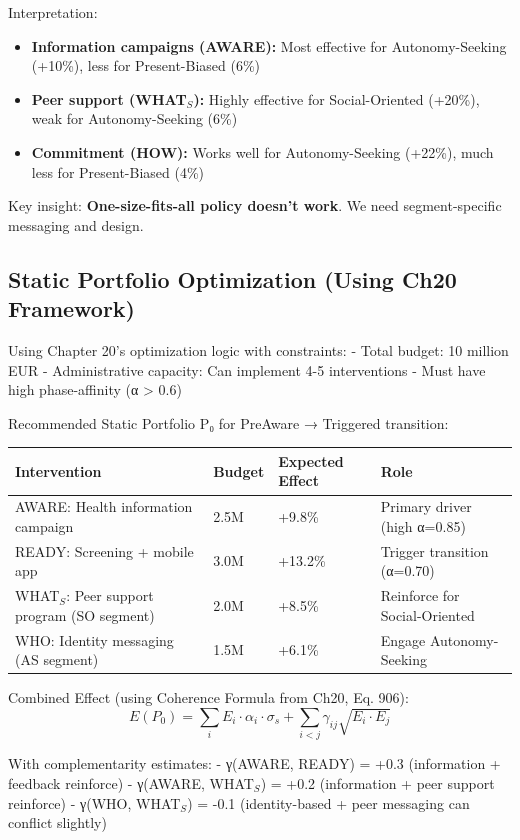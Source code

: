 Interpretation:
\begin{itemize}
\item \textbf{Information campaigns (AWARE):} Most effective for Autonomy-Seeking (+10\%), less for Present-Biased (6\%)
\item \textbf{Peer support (WHAT$_S$):} Highly effective for Social-Oriented (+20\%), weak for Autonomy-Seeking (6\%)
\item \textbf{Commitment (HOW):} Works well for Autonomy-Seeking (+22\%), much less for Present-Biased (4\%)
\end{itemize}

Key insight: \textbf{One-size-fits-all policy doesn't work}. We need segment-specific messaging and design.

\subsection{Static Portfolio Optimization (Using Ch20 Framework)}

Using Chapter 20's optimization logic with constraints:
- Total budget: 10 million EUR
- Administrative capacity: Can implement 4-5 interventions
- Must have high phase-affinity (α > 0.6)

Recommended Static Portfolio P₀ for PreAware → Triggered transition:

\begin{center}
\begin{tabular}{@{}llll@{}}
\toprule
\textbf{Intervention} & \textbf{Budget} & \textbf{Expected Effect} & \textbf{Role} \\
\midrule
AWARE: Health information campaign & 2.5M & +9.8\% & Primary driver (high α=0.85) \\
READY: Screening + mobile app & 3.0M & +13.2\% & Trigger transition (α=0.70) \\
WHAT$_S$: Peer support program (SO segment) & 2.0M & +8.5\% & Reinforce for Social-Oriented \\
WHO: Identity messaging (AS segment) & 1.5M & +6.1\% & Engage Autonomy-Seeking \\
\midrule
\end{tabular}
\end{center}

Combined Effect (using Coherence Formula from Ch20, Eq. 906):
$$E(P_0) = \sum_i E_i \cdot \alpha_i \cdot \sigma_s + \sum_{i<j} \gamma_{ij} \sqrt{E_i \cdot E_j}$$

With complementarity estimates:
- γ(AWARE, READY) = +0.3 (information + feedback reinforce)
- γ(AWARE, WHAT$_S$) = +0.2 (information + peer support reinforce)
- γ(WHO, WHAT$_S$) = -0.1 (identity-based + peer messaging can conflict slightly)

